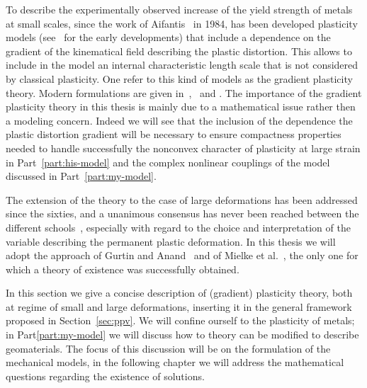 \documentclass[a4paper,10pt,twoside]{amsbook}
\numberwithin{section}{chapter}
\numberwithin{equation}{chapter}
\theoremstyle{definition}
\begin{document}
To describe the experimentally observed increase of the yield strength of metals at small scales, since the work of Aifantis~\cite{Aifantis1984} in 1984, has been developed plasticity models (see~\cite{FleckHutchinson1993} for the early developments) that include a dependence on the gradient of the kinematical field describing the plastic distortion. This allows to include in the model an internal characteristic length scale that is not considered by classical plasticity. One refer to this kind of models as the gradient plasticity theory. Modern formulations are given in~\cite{gurtin-anand-small},~\cite{gurtin-anand-large} and \cite{BertramForest2020}. The importance of the gradient plasticity theory in this thesis is mainly due to a mathematical issue rather then a modeling concern. Indeed we will see that the inclusion of the dependence the plastic distortion gradient will be necessary to ensure compactness properties needed to handle successfully the nonconvex character of plasticity at large strain in Part~\ref{part:his-model} and the complex nonlinear couplings of the model discussed in Part~\ref{part:my-model}.


The extension of the theory to the case of large deformations has been addressed since the sixties, and a unanimous consensus has never been reached between the different schools~\cite{Naghdi1990,DavoliFrancfort2021}, especially with regard to the choice and interpretation of the variable describing the permanent plastic deformation. In this thesis we will adopt the approach of Gurtin and Anand~\cite{gurtin-anand-fried,gurtin-anand-large} and of Mielke et al.~\cite{mielke}, the only one for which a theory of existence was successfully obtained.

In this section we give a concise description of (gradient) plasticity theory, both at regime of small and large deformations, inserting it in the general framework proposed in Section~\ref{sec:ppv}. We will confine ourself to the plasticity of metals; in Part\ref{part:my-model} we will discuss how to theory can be modified to describe geomaterials. The focus of this discussion will be on the formulation of the mechanical models, in the following chapter we will address the mathematical questions regarding the existence of solutions.
\end{document}
